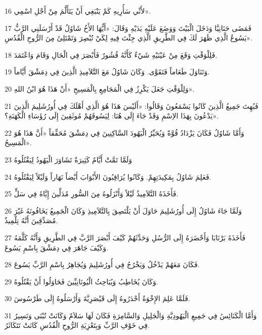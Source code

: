 \par 16 لأَنِّي سَأُرِيهِ كَمْ يَنْبَغِي أَنْ يَتَأَلَّمَ مِنْ أَجْلِ اسْمِي».
\par 17 فَمَضَى حَنَانِيَّا وَدَخَلَ الْبَيْتَ وَوَضَعَ عَلَيْهِ يَدَيْهِ وَقَالَ: «أَيُّهَا الأَخُ شَاوُلُ قَدْ أَرْسَلَنِي الرَّبُّ يَسُوعُ الَّذِي ظَهَرَ لَكَ فِي الطَّرِيقِ الَّذِي جِئْتَ فِيهِ لِكَيْ تُبْصِرَ وَتَمْتَلِئَ مِنَ الرُّوحِ الْقُدُسِ».
\par 18 فَلِلْوَقْتِ وَقَعَ مِنْ عَيْنَيْهِ شَيْءٌ كَأَنَّهُ قُشُورٌ فَأَبْصَرَ فِي الْحَالِ وَقَامَ وَاعْتَمَدَ.
\par 19 وَتَنَاوَلَ طَعَاماً فَتَقَوَّى. وَكَانَ شَاوُلُ مَعَ التَّلاَمِيذِ الَّذِينَ فِي دِمَشْقَ أَيَّاماً.
\par 20 وَلِلْوَقْتِ جَعَلَ يَكْرِزُ فِي الْمَجَامِعِ بِالْمَسِيحِ «أَنْ هَذَا هُوَ ابْنُ اللهِ».
\par 21 فَبُهِتَ جَمِيعُ الَّذِينَ كَانُوا يَسْمَعُونَ وَقَالُوا: «أَلَيْسَ هَذَا هُوَ الَّذِي أَهْلَكَ فِي أُورُشَلِيمَ الَّذِينَ يَدْعُونَ بِهَذَا الاِسْمِ وَقَدْ جَاءَ إِلَى هُنَا: لِيَسُوقَهُمْ مُوثَقِينَ إِلَى رُؤَسَاءِ الْكَهَنَةِ؟».
\par 22 وَأَمَّا شَاوُلُ فَكَانَ يَزْدَادُ قُوَّةً وَيُحَيِّرُ الْيَهُودَ السَّاكِنِينَ فِي دِمَشْقَ مُحَقِّقاً «أَنَّ هَذَا هُوَ الْمَسِيحُ».
\par 23 وَلَمَّا تَمَّتْ أَيَّامٌ كَثِيرَةٌ تَشَاوَرَ الْيَهُودُ لِيَقْتُلُوهُ
\par 24 فَعَلِمَ شَاوُلُ بِمَكِيدَتِهِمْ. وَكَانُوا يُرَاقِبُونَ الأَبْوَابَ أَيْضاً نَهَاراً وَلَيْلاً لِيَقْتُلُوهُ.
\par 25 فَأَخَذَهُ التَّلاَمِيذُ لَيْلاً وَأَنْزَلُوهُ مِنَ السُّورِ مُدَلِّينَ إِيَّاهُ فِي سَلٍّ.
\par 26 وَلَمَّا جَاءَ شَاوُلُ إِلَى أُورُشَلِيمَ حَاوَلَ أَنْ يَلْتَصِقَ بِالتَّلاَمِيذِ وَكَانَ الْجَمِيعُ يَخَافُونَهُ غَيْرَ مُصَدِّقِينَ أَنَّهُ تِلْمِيذٌ.
\par 27 فَأَخَذَهُ بَرْنَابَا وَأَحْضَرَهُ إِلَى الرُّسُلِ وَحَدَّثَهُمْ كَيْفَ أَبْصَرَ الرَّبَّ فِي الطَّرِيقِ وَأَنَّهُ كَلَّمَهُ وَكَيْفَ جَاهَرَ فِي دِمَشْقَ بِاسْمِ يَسُوعَ.
\par 28 فَكَانَ مَعَهُمْ يَدْخُلُ وَيَخْرُجُ فِي أُورُشَلِيمَ وَيُجَاهِرُ بِاسْمِ الرَّبِّ يَسُوعَ.
\par 29 وَكَانَ يُخَاطِبُ وَيُبَاحِثُ الْيُونَانِيِّينَ فَحَاوَلُوا أَنْ يَقْتُلُوهُ.
\par 30 فَلَمَّا عَلِمَ الإِخْوَةُ أَحْدَرُوهُ إِلَى قَيْصَرِيَّةَ وَأَرْسَلُوهُ إِلَى طَرْسُوسَ.
\par 31 وَأَمَّا الْكَنَائِسُ فِي جَمِيعِ الْيَهُودِيَّةِ وَالْجَلِيلِ وَالسَّامِرَةِ فَكَانَ لَهَا سَلاَمٌ وَكَانَتْ تُبْنَى وَتَسِيرُ فِي خَوْفِ الرَّبِّ وَبِتَعْزِيَةِ الرُّوحِ الْقُدُسِ كَانَتْ تَتَكَاثَرُ.

